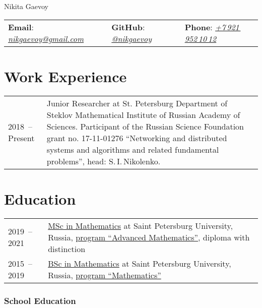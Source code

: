 \documentclass[a4paper, 11pt]{article}
\begin{document}


\begin{center}
	{\Huge Nikita Gaevoy}
\end{center}

\begin{center}
	\begin{tabular}{lll}
		\textbf{Email}: \href{mailto:nikgaevoy@gmail.com}{{\it nikgaevoy@gmail.com}} &
		\hspace{0.13cm} \textbf{GitHub}: \href{https://github.com/nikgaevoy}{{\it @nikgaevoy}} &
		\hspace{0.13cm} \textbf{Phone}: \href{tel:+79219521012}{{\it +7\,921\,952\,10\,12}}
	\end{tabular}
\end{center}

\section*{Work Experience}

\begin{tabularx}{\textwidth}{lX}
	2018~-- Present & Junior Researcher at St. Petersburg Department of Steklov Mathematical Institute of Russian Academy of Sciences. Participant of the Russian Science Foundation grant no. 17-11-01276 ``Networking and distributed systems and algorithms and related fundamental problems'', head: S.\,I.\,Nikolenko.
	\\
\end{tabularx}


\section*{Education}

\begin{tabularx}{\textwidth}{lX}
	2019~-- 2021 & \href{https://diploma.spbu.ru/s/?rn=3121007\&bd=19980122\&h=67a15239b3294582867a44ba9e42cf98}{MSc in Mathematics} at Saint Petersburg University, Russia, \href{https://math-cs.spbu.ru/en/msc-math-en/}{program ``Advanced Mathematics''}, diploma with distinction \\
	2015~-- 2019 & \href{https://diploma.spbu.ru/s/?rn=0911007\&bd=19980122\&h=a34dc3393d004d5fb149a60e3545b673}{BSc in Mathematics} at Saint Petersburg University, Russia, \href{https://math-cs.spbu.ru/en/}{program ``Mathematics''}
\end{tabularx}

\subsubsection*{School Education}
\end{document}
